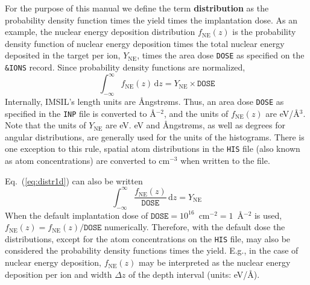 For the purpose of this manual we define the term \textbf{distribution} as the
probability density function times the yield times the implantation dose. As an
example, the nuclear energy deposition distribution $f_\mathrm{NE}(z)$ is the
probability density function of nuclear energy deposition times the total
nuclear energy deposited in the target per ion, $Y_\mathrm{NE}$, times the area
dose \texttt{DOSE} as specified on the \texttt{\&IONS} record. Since probability
density functions are normalized, 
%
\begin{equation}
    \int_{-\infty}^{\infty} f_\mathrm{NE}(z)\,\mathrm{d}z
    = Y_\mathrm{NE} \times \texttt{DOSE}
    \label{eq:distr1d}
\end{equation}
%
Internally, IMSIL's length units are {\AA}ngstr{\o}ms. Thus, an area dose
\texttt{DOSE} as specified in the \texttt{INP} file is converted to
{\AA}$^{-2}$, and the units of $f_\mathrm{NE}(z)$ are eV/{\AA}$^3$. Note that
the units of $Y_\mathrm{NE}$ are eV. eV and {\AA}ngstr{\o}ms, as well as degrees
for angular distributions, are generally used for the units of the histograms.
There is one exception to this rule, spatial atom distributions in the
\texttt{HIS} file (also known as atom concentrations) are converted to cm$^{-3}$
when written to the file. 

Eq.~(\ref{eq:distr1d}) can also be written
%
\begin{equation}
    \int_{-\infty}^{\infty} 
    \frac{ f_\mathrm{NE}(z) }{ \texttt{DOSE} } \, \mathrm{d}z
    = Y_\mathrm{NE}
    \label{eq:distr1d_a}
\end{equation}
%
When the default implantation dose of $\texttt{DOSE} =
10^{16}$~cm$^{-2} = 1$~{\AA}$^{-2}$ is used, $f_\mathrm{NE}(z) =
f_\mathrm{NE}(z) / \texttt{DOSE}$ numerically. Therefore, with the default
dose the distributions, except for the atom concentrations on the \texttt{HIS}
file, may also be considered the probability density functions times the yield.
E.g., in the case of nuclear energy deposition, $f_\mathrm{NE}(z)$ may be
interpreted as the nuclear energy deposition per ion and width $\Delta z$ of the
depth interval (units: eV/{\AA}).

